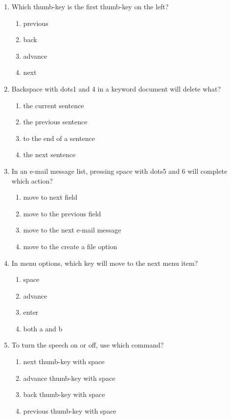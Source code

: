 \documentclass[10pt,letterpaper,twoside]{report}
\begin{document}
{{{\begin{enumerate}
\begin{enumerate}
		      \item both b and c
	      \end{enumerate}
	\item Which thumb-key is the first thumb-key on the left?
	      \begin{enumerate}
		      \item previous
		      \item back
		      \item advance
		      \item next
	      \end{enumerate}
	\item Backspace with dots1 and 4 in a keyword document will delete what?
	      \begin{enumerate}
		      \item the current sentence
		      \item the previous sentence
		      \item to the end of a sentence
		      \item the next sentence
	      \end{enumerate}
	\item In an e-mail message list, pressing space with dots5 and 6 will complete which action?
	      \begin{enumerate}
		      \item move to next field
		      \item move to the previous field
		      \item move to the next e-mail message
		      \item move to the create a file option
	      \end{enumerate}
	\item In menu options, which key will move to the next menu item?
	      \begin{enumerate}
		      \item space
		      \item advance
		      \item enter
		      \item both a and b
	      \end{enumerate}
	\item To turn the speech on or off, use which command?
	      \begin{enumerate}
		      \item next thumb-key with space
		      \item advance thumb-key with space
		      \item back thumb-key with space
		      \item previous thumb-key with space
	      \end{enumerate}
\end{enumerate}

}}}
\end{document}
